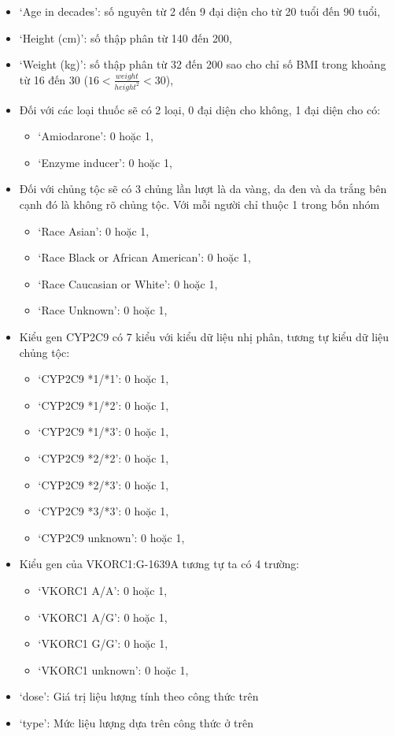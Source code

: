 \documentclass[14pt,oneside]{scrbook}
\providecommand{\tightlist}{\setlength{\itemsep}{\smallskipamount}\setlength{\parskip}{\smallskipamount}}
\begin{document}
\begin{itemize}
\tightlist
\item
  `Age in decades': số nguyên từ 2 đến 9 đại diện cho từ 20 tuổi đến 90
  tuổi,
\item
  `Height (cm)': số thập phân từ 140 đến 200,
\item
  `Weight (kg)': số thập phân từ 32 đến 200 sao cho chỉ số BMI trong
  khoảng từ 16 đến 30 (\(16 < \frac{weight}{height^2} < 30\)),
\item
  Đối với các loại thuốc sẽ có 2 loại, 0 đại diện cho không, 1 đại diện
  cho có:

  \begin{itemize}
  \tightlist
  \item
    `Amiodarone': 0 hoặc 1,
  \item
    `Enzyme inducer': 0 hoặc 1,
  \end{itemize}
\item
  Đối với chủng tộc sẽ có 3 chủng lần lượt là da vàng, da đen và da
  trắng bên cạnh đó là không rõ chủng tộc. Với mỗi người chỉ thuộc 1
  trong bốn nhóm

  \begin{itemize}
  \tightlist
  \item
    `Race Asian': 0 hoặc 1,
  \item
    `Race Black or African American': 0 hoặc 1,
  \item
    `Race Caucasian or White': 0 hoặc 1,
  \item
    `Race Unknown': 0 hoặc 1,
  \end{itemize}
\item
  Kiểu gen CYP2C9 có 7 kiểu với kiểu dữ liệu nhị phân, tương tự kiểu dữ
  liệu chủng tộc:

  \begin{itemize}
  \tightlist
  \item
    `CYP2C9 *1/*1': 0 hoặc 1,
  \item
    `CYP2C9 *1/*2': 0 hoặc 1,
  \item
    `CYP2C9 *1/*3': 0 hoặc 1,
  \item
    `CYP2C9 *2/*2': 0 hoặc 1,
  \item
    `CYP2C9 *2/*3': 0 hoặc 1,
  \item
    `CYP2C9 *3/*3': 0 hoặc 1,
  \item
    `CYP2C9 unknown': 0 hoặc 1,
  \end{itemize}
\item
  Kiểu gen của VKORC1:G-1639A tương tự ta có 4 trường:

  \begin{itemize}
  \tightlist
  \item
    `VKORC1 A/A': 0 hoặc 1,
  \item
    `VKORC1 A/G': 0 hoặc 1,
  \item
    `VKORC1 G/G': 0 hoặc 1,
  \item
    `VKORC1 unknown': 0 hoặc 1,
  \end{itemize}
\item
  `dose': Giá trị liệu lượng tính theo công thức trên
\item
  `type': Mức liệu lượng dựa trên công thức ở trên
\end{itemize}
\end{document}

